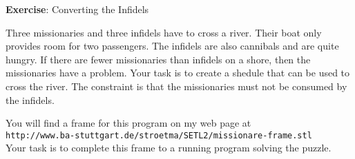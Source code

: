 \documentclass{article}
\begin{document}
\noindent
{\Large \textbf{Exercise}: Converting the Infidels}
\vspace{0.5cm}


\noindent
Three missionaries and three infidels have to cross a river. Their boat 
only provides room for two passengers. The infidels are also cannibals
and are quite hungry.  If there are fewer missionaries than infidels on a
shore, then the missionaries have a problem.  Your task is to create a shedule
that can be used to cross the river.  The constraint is that the 
missionaries must not be consumed by the infidels.

You will find a frame for this program on my web page at
\\[0.1cm]
\hspace*{0.8cm}      
\texttt{http://www.ba-stuttgart.de/stroetma/SETL2/missionare-frame.stl} 
\\[0.1cm]
Your task is to complete this frame to a running program solving the puzzle.
\end{document}
